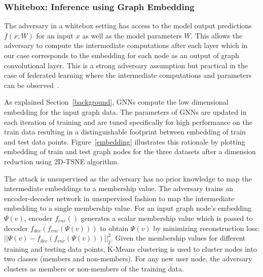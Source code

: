 \subsubsection{Whitebox: Inference using Graph Embedding}

The adversary in a whitebox setting has access to the model output predictions $f(x; W)$ for an input $x$ as well as the model parameters $W$.
This allows the adversary to compute the intermediate computations after each layer which in our case corresponds to the embedding for each node as an output of graph convolutional layer.
This is a strong adversary assumption but practical in the case of federated learning where the intermediate computations and parameters can be observed~\cite{whitebox,collabinf}.

As explained Section~\ref{background}, GNNs compute the low dimensional embedding for the input graph data.
The parameters of GNNs are updated in each iteration of training and are tuned specifically for high performance on the train data resulting in a distinguishable footprint between embedding of train and test data points.
Figure~\ref{embedding} illustrates this rationale by plotting embedding of train and test graph nodes for the three datasets after a dimension reduction using 2D-TSNE algorithm.


The attack is unsupervised as the adversary has no prior knowledge to map the intermediate embeddings to a membership value. %
The adversary trains an encoder-decoder network in unsupervised fashion to map the intermediate embedding to a single membership value.
For an input graph node's embedding $\Psi (v)$, encoder $f_{enc}()$ generates a scalar membership value which is passed to decoder $f_{dec}(f_{enc}(\Psi (v)))$ to obtain $\Psi(v)$ by minimizing reconstruction loss: $||\Psi (v) - f_{dec}(f_{enc}(\Psi (v)))||_2^2$.
Given the membership values for different training and testing data points, K-Means clustering is used to cluster nodes into two classes (members and non-members).
For any new user node, the adversary clusters as members or non-members of the training data.









